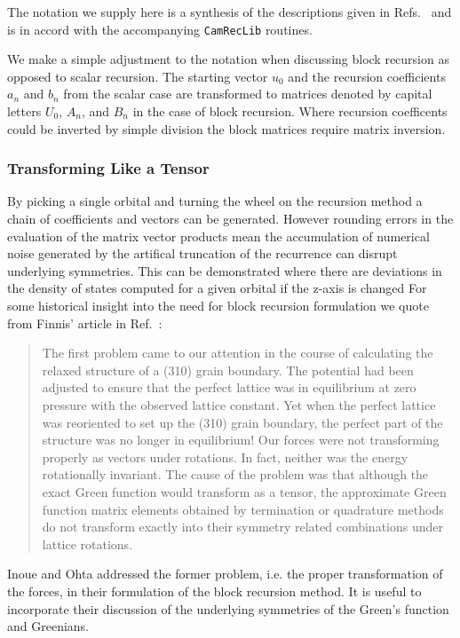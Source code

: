 The notation we supply here is a synthesis of the descriptions 
given in Refs.~\cite{paxton88, nex89} and is in 
accord with the accompanying \texttt{CamRecLib} routines.

We make a simple adjustment to the notation when discussing
block recursion as opposed to scalar recursion.
The starting vector $u_{0}$ and the recursion coefficients
$a_{n}$ and $b_{n}$ from the scalar case are transformed to
matrices denoted by capital letters $U_{0}$, $A_{n}$, and $B_{n}$
in the case of block recursion. Where recursion coefficents could be
inverted by simple division the block matrices require matrix inversion.

\subsubsection{Transforming Like a Tensor}
By picking a single orbital and turning the wheel on the recursion method a
chain of coefficients and vectors can be generated. However rounding errors in the evaluation
of the matrix vector products mean the accumulation of numerical noise
generated by the artifical truncation of the recurrence
can disrupt underlying symmetries. This can be demonstrated where there are 
deviations in the density of states computed for a given orbital if the z-axis 
is changed For some historical insight into the need for block recursion formulation
we quote from Finnis' article in Ref.~\cite{andersen89}:

\begin{quote}
The first problem came to our attention in the course of 
calculating the relaxed structure of a (310) grain boundary.
The potential had been adjusted to ensure that the perfect lattice
was in equilibrium at zero pressure with the observed lattice constant. Yet
when the perfect lattice was reoriented to set up the (310) grain boundary, the 
perfect part of the structure was no longer in equilibrium! Our forces were not transforming
properly as vectors under rotations. In fact, neither was the energy rotationally invariant.
The cause of the problem was that although the exact Green function would transform as a tensor,
the approximate Green function matrix elements obtained by termination or quadrature
methods do not transform exactly into their symmetry related combinations under lattice 
rotations.
\end{quote}

Inoue and Ohta addressed the former problem, i.e. the proper transformation of the forces,
in their formulation of the block recursion method\cite{inoue87}. 
It is useful to incorporate their discussion of the underlying 
symmetries of the Green's function and Greenians.

